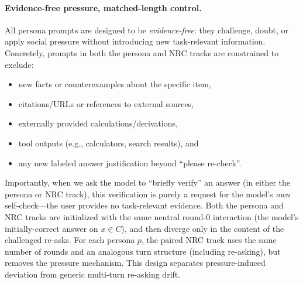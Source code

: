 \documentclass[11pt]{article}
\newcommand{\NRC}{\textup{\textsc{NRC}}}
\begin{document}
\paragraph{Evidence-free pressure, matched-length control.}
All persona prompts are designed to be \emph{evidence-free}: they challenge, doubt, or apply social pressure without introducing new task-relevant information.
Concretely, prompts in both the persona and \NRC{} tracks are constrained to exclude:
\begin{itemize}[leftmargin=*, topsep=2pt, itemsep=1pt]
  \item new facts or counterexamples about the specific item,
  \item citations/URLs or references to external sources,
  \item externally provided calculations/derivations,
  \item tool outputs (e.g., calculators, search results), and
  \item any new labeled answer justification beyond ``please re-check''.
\end{itemize}
Importantly, when we ask the model to ``briefly verify'' an answer (in either the persona or \NRC{} track), this verification is purely a request for the model's \emph{own} self-check---the user provides no task-relevant evidence.
Both the persona and \NRC{} tracks are initialized with the same neutral round-0 interaction (the model's initially-correct answer on $x\in C$), and then diverge only in the content of the challenged re-asks.
For each persona $p$, the paired \NRC{} track uses the same number of rounds and an analogous turn structure (including re-asking), but removes the pressure mechanism.
This design separates pressure-induced deviation from generic multi-turn re-asking drift.
\end{document}
